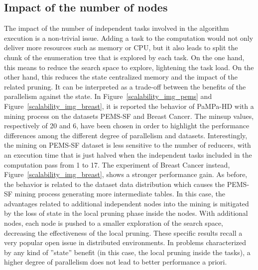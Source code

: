 \subsection{Impact of the number of nodes}\label{scalability}
The impact of the number of independent tasks involved in the algorithm execution is a non-trivial issue. 
Adding a task to the computation would not only deliver more resources such as memory or CPU, 
but it also leads to split the chunk of the enumeration tree that is explored by each task. 
On the one hand, this means to reduce the search space to explore, lightening the task load. 
On the other hand, this reduces the state centralized memory and the impact of the related pruning. 
It can be interpreted as a trade-off between the benefits of the parallelism against the state.
In Figure~\ref{scalability_img_pems} and Figure~\ref{scalability_img_breast}, it is reported the behavior of PaMPa-HD with a mining process on the datasets PEMS-SF and Breast Cancer. The minsup values, respectively of 20 and 6, have been chosen in order to highlight the performance differences among the different degree of parallelism and datasets.
Interestingly, the mining on PEMS-SF dataset is less sensitive to the number of reducers, with an execution time that is just halved when the independent tasks included in the computation pass from 1 to 17. The experiment of Breast Cancer instead, Figure~\ref{scalability_img_breast}, shows a stronger performance gain.
As before, the behavior is related to the dataset data distribution which causes the PEMS-SF mining process generating more intermediate tables.
In this case, the advantages related to additional independent nodes into the mining 
is mitigated by the loss of state in the local pruning phase inside the nodes. 
With additional nodes, each node is pushed to a smaller exploration of the search space, 
decreasing the effectiveness of the local pruning.
These specific results recall a very popular open issue in distributed environments. 
In problems characterized by any kind of ''state'' benefit 
(in this case, the local pruning inside the tasks), 
a higher degree of parallelism does not lead to better performance a priori.


